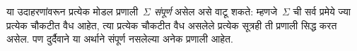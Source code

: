 \documentclass[../../../include/open-logic-section]{subfiles}
\begin{document}
या उदाहरणांवरून प्रत्येक मोडल
प्रणाली~$\Sigma$ \emph{संपूर्ण}
असेल असे वाटू शकते: म्हणजे~$\Sigma$
ची सर्व प्रमेये ज्या प्रत्येक चौकटीत
वैध आहेत, त्या प्रत्येक चौकटीत
वैध असलेले प्रत्येक सूत्रही
ती प्रणाली सिद्ध करत असेल.
पण दुर्दैवाने या अर्थाने संपूर्ण
नसलेल्या अनेक प्रणाली आहेत.
\end{document}
